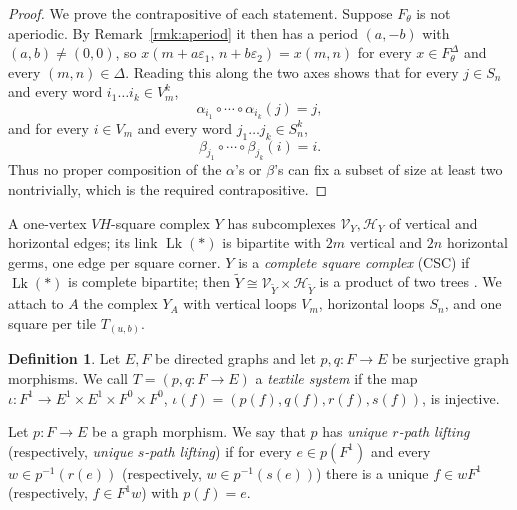 \documentclass[11pt,reqno]{amsart}
\theoremstyle{plain}
\theoremstyle{definition}
\newtheorem{definition}[theorem]{Definition}
\newcommand{\Lk}{\operatorname{Lk}}
\newcommand{\Vm}{V_m}
\newcommand{\Sn}{S_n}
\newcommand{\eps}{\varepsilon}
\begin{document}
\begin{proof}
We prove the contrapositive of each statement. Suppose $F_\theta$ is not aperiodic.
By Remark~\ref{rmk:aperiod} it then has a period $(a,-b)$ with
$(a,b)\neq(0,0)$, so $x(m+a\eps_1,\,n+b\eps_2)=x(m,n)$ for every $x\in F_\theta^\Delta$
and every $(m,n)\in\Delta$. Reading this along the two axes shows that for every
$j\in S_n$ and every word $i_1\ldots i_k\in V_m^k$,
\[
\alpha_{i_1}\circ\cdots\circ\alpha_{i_k}(j)=j,
\]
and for every $i\in V_m$ and every word $j_1\ldots j_k\in S_n^k$,
\[
\beta_{j_1}\circ\cdots\circ\beta_{j_k}(i)=i.
\]
Thus no proper composition of the $\alpha$'s or $\beta$'s can fix a subset of size at
least two nontrivially, which is the required contrapositive.
\end{proof}


A one-vertex $VH$-square complex $Y$ has subcomplexes $\mathcal V_Y,\mathcal H_Y$ of
vertical and horizontal edges; its link $\Lk(*)$ is bipartite with $2m$ vertical and
$2n$ horizontal germs, one edge per square corner. $Y$ is a \emph{complete square
complex} (CSC) if $\Lk(*)$ is complete bipartite; then $\widetilde Y\cong
\mathcal V_{\widetilde Y}\times\mathcal H_{\widetilde Y}$ is a product of two trees
\cite[Theorem~3.8]{W}. We attach to $A$ the complex $Y_A$ with vertical loops $\Vm$,
horizontal loops $\Sn$, and one square per tile $T_{(u,b)}$.

\begin{definition}
Let $E,F$ be directed graphs and let $p,q\colon F\to E$ be surjective graph
morphisms. We call $T=(p,q\colon F\to E)$ a \emph{textile system} if the map
$\iota\colon F^1\to E^1\times E^1\times F^0\times F^0$,
$\iota(f)=(p(f),q(f),r(f),s(f))$, is injective.
\end{definition}

\noindent
Let $p\colon F\to E$ be a graph morphism. We say that $p$ has \emph{unique $r$-path
lifting} (respectively, \emph{unique $s$-path lifting}) if for every $e\in p(F^1)$
and every $w\in p^{-1}(r(e))$ (respectively, $w\in p^{-1}(s(e))$) there is a unique
$f\in wF^1$ (respectively, $f\in F^1w$) with $p(f)=e$.
\end{document}
